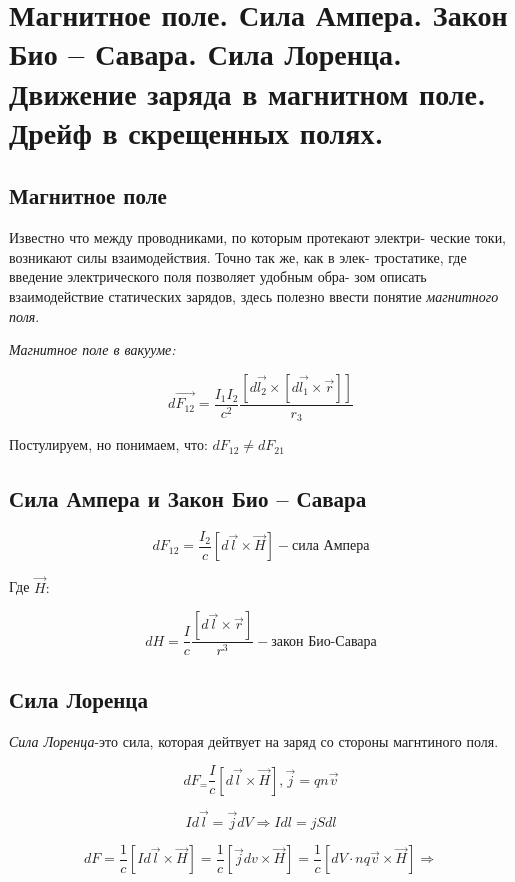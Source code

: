 \section{Магнитное поле. Сила Ампера. Закон Био – Савара. Сила Лоренца.
Движение заряда в магнитном поле. Дрейф в скрещенных полях.}
 
\subsection*{Магнитное поле}


Известно что между проводниками, по которым протекают электри-
ческие токи, возникают силы взаимодействия. Точно так же, как в элек-
тростатике, где введение электрического поля позволяет удобным обра-
зом описать взаимодействие статических зарядов, здесь полезно ввести
понятие \textit{магнитного поля}.

\textit{Магнитное поле в вакууме:}


\[
d\vec{F_{12}}= \frac{I_1 I_2 }{c^2} \frac{[d\vec{l_2}\times [d\vec{l_1}\times \vec{r}]]}{r_{3}}  
\]

Постулируем, но понимаем, что: $dF_{12}\neq dF_{21}$

\subsection*{Сила Ампера и Закон Био – Савара}

\[
dF_{12}=\frac{I_2}{c}[d\vec{l}\times \vec{H}]-\textit{сила Ампера}  
\]

Где $\vec{H}:$

\[
dH=\frac{I}{c} \frac{[d\vec{l} \times \vec{r}]}{r^3} - \textit{закон Био-Савара}  
\]

\subsection*{Сила Лоренца}


\textit{Сила Лоренца}-это сила, которая дейтвует на заряд со стороны магнтиного поля. 

\[
    dF_=\frac{I}{c}[d\vec{l}\times \vec{H}],\vec{j}=qn\vec{v}
\]

\[
Id\vec{l}=\vec{j}dV \Rightarrow Idl=jSdl
\]

\[
dF=\frac{1}{c}[Id\vec{l}\times \vec{H}]=\frac{1}{c}[\vec{j}dv \times \vec{H}]=\frac{1}{c} [dV\cdot nq\vec{v}\times \vec{H} ] \Rightarrow 
\]

